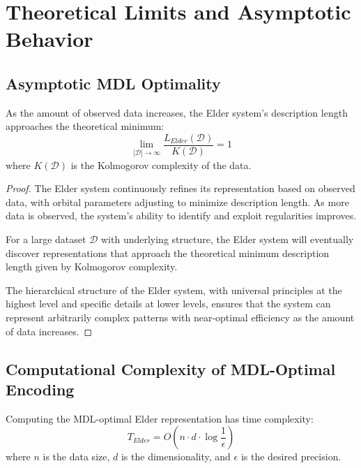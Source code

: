 \section{Theoretical Limits and Asymptotic Behavior}

\subsection{Asymptotic MDL Optimality}

\begin{theorem}
As the amount of observed data increases, the Elder system's description length approaches the theoretical minimum:
\begin{equation}
\lim_{|\mathcal{D}| \to \infty} \frac{L_{Elder}(\mathcal{D})}{K(\mathcal{D})} = 1
\end{equation}
where $K(\mathcal{D})$ is the Kolmogorov complexity of the data.
\end{theorem}

\begin{proof}
The Elder system continuously refines its representation based on observed data, with orbital parameters adjusting to minimize description length. As more data is observed, the system's ability to identify and exploit regularities improves.

For a large dataset $\mathcal{D}$ with underlying structure, the Elder system will eventually discover representations that approach the theoretical minimum description length given by Kolmogorov complexity.

The hierarchical structure of the Elder system, with universal principles at the highest level and specific details at lower levels, ensures that the system can represent arbitrarily complex patterns with near-optimal efficiency as the amount of data increases.
\end{proof}

\subsection{Computational Complexity of MDL-Optimal Encoding}

\begin{theorem}
Computing the MDL-optimal Elder representation has time complexity:
\begin{equation}
T_{Elder} = O(n \cdot d \cdot \log \frac{1}{\epsilon})
\end{equation}
where $n$ is the data size, $d$ is the dimensionality, and $\epsilon$ is the desired precision.
\end{theorem}


